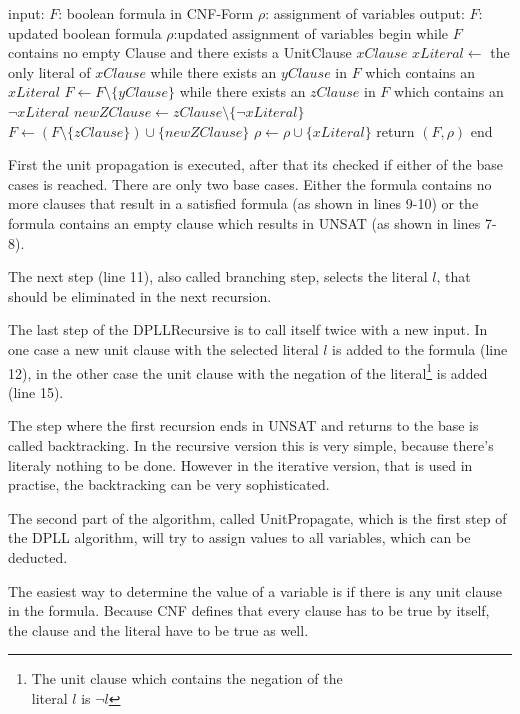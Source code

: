 \begin{algorithm}[caption={UnitPropagate}, label={algUnitProgagate}]
 input: $F$: boolean formula in CNF-Form
	$\rho$: assignment of variables
 output: $F$: updated boolean formula
	$\rho$:updated assignment of variables
 begin
   while $F$ contains no empty Clause
   and there exists a UnitClause $xClause$
       $xLiteral \gets$ the only literal of $xClause$
       while there exists an $yClause$ in $F$
       which contains an $xLiteral$
           $F \gets F \setminus \{yClause\}$     
       while there exists an $zClause$ in $F$
       which contains an $\lnot xLiteral$
           $newZClause \gets zClause \setminus \{\lnot xLiteral\}$
           $F \gets (F \setminus \{zClause\}) \cup \{newZClause\}$
       $\rho \gets \rho \cup \{xLiteral\}$
   return $(F, \rho)$
 end
\end{algorithm}


First the unit propagation is executed, after that its checked if either of the base cases is reached. 
There are only two base cases. Either the formula contains no more clauses that result in a satisfied formula (as shown in lines 9-10) or the formula contains an empty clause which results in UNSAT (as shown in lines 7-8).

The next step (line 11), also called branching step, selects the literal $l$, that should be eliminated in the next recursion.

The last step of the DPLLRecursive is to call itself twice with a new input. In one case a new unit clause with the selected literal $l$ is added to the formula (line 12), in the other case the unit clause with the negation of the literal\footnote{The unit clause which contains the negation of the \\ literal $l$ is $\lnot l$} is added (line 15).

The step where the first recursion ends in UNSAT and returns to the base is called backtracking. In the recursive version this is very simple, because there's literaly nothing to be done. However in the iterative version, that is used in practise, the backtracking can be very sophisticated.

The second part of the algorithm, called UnitPropagate, which is the first step of the DPLL algorithm, will try to assign values to all variables, which can be deducted.

The easiest way to determine the value of a variable is if there is any unit clause in the formula. Because CNF defines that every clause has to be true by itself, the clause and the literal have to be true as well.

